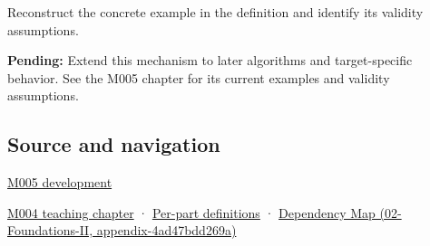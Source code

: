 Reconstruct the concrete example in the definition and identify its validity assumptions.

\textbf{Pending:} Extend this mechanism to later algorithms and target-specific behavior. See the M005 chapter for its current examples and validity assumptions.

\subsection{Source and navigation}\label{appendix-ed8531b46754-source-and-navigation}

\hyperref[01-foundations-i-ch001-when-arithmetic-meets-uncertainty]{M005 development}

\hyperref[01-foundations-i-ch001-a-stretching-ruler-for-real-valued-quantities]{M004 teaching chapter} · \hyperref[appendix-fd090d982a15-m004---parts-61-76]{Per-part definitions} · \href{../02-Foundations-II/main.pdf\#nameddest=appendix-4ad47bdd269a}{Dependency Map (02-Foundations-II, appendix-4ad47bdd269a)}
